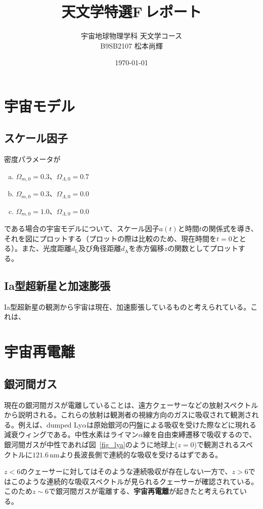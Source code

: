 \documentclass[a4paper,papersize,uplatex,dvipdfmx,10pt]{jsarticle}
\title{天文学特選F\,レポート}
\author{宇宙地球物理学科\,\,天文学コース\\B9SB2107\,\,松本尚輝}
\date{\today}
\begin{document}
\maketitle
\section{宇宙モデル}
\subsection{スケール因子}
密度パラメータが
\begin{enumerate}[(a)]
  \item $\Omega_{m,0}=0.3$、$\Omega_{\Lambda,0}=0.7$
  \item $\Omega_{m,0}=0.3$、$\Omega_{\Lambda,0}=0.0$
  \item $\Omega_{m,0}=1.0$、$\Omega_{\Lambda,0}=0.0$
\end{enumerate}
である場合の宇宙モデルについて、スケール因子$a(t)$と時間$t$の関係式を導き、それを図にプロットする（プロットの際は比較のため、現在時間を$t=0$ととる）。また、光度距離$d_{\mathrm{L}}$及び角径距離$d_{\mathrm{A}}$を赤方偏移$z$の関数としてプロットする。



\subsection{Ia型超新星と加速膨張}
Ia型超新星の観測から宇宙は現在、加速膨張しているものと考えられている。これは、

\section{宇宙再電離}
\subsection{銀河間ガス}
現在の銀河間ガスが電離していることは、遠方クェーサーなどの放射スペクトルから説明される。これらの放射は観測者の視線方向のガスに吸収されて観測される。例えば、dumped Ly$\alpha$は原始銀河の円盤による吸収を受けた際などに現れる減衰ウィングである。中性水素はライマン$\alpha$線を自由束縛遷移で吸収するので、銀河間ガスが中性であれば図~\ref{fig_lya}のように地球上($z=0$)で観測されるスペクトルに$121.6\,\mathrm{nm}$より長波長側で連続的な吸収を受けるはずである。

$z<6$のクェーサーに対してはそのような連続吸収が存在しない一方で、$z>6$ではこのような連続的な吸収スペクトルが見られるクェーサーが確認されている。このため$z\sim6$で銀河間ガスが電離する、\textbf{宇宙再電離}が起きたと考えられている。
\end{document}
